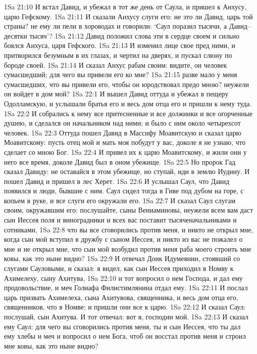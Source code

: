 1Sa 21:10  И встал Давид, и убежал в тот же день от Саула, и пришел к Анхусу, царю Гефскому.
1Sa 21:11  И сказали Анхусу слуги его: не это ли Давид, царь той страны? не ему ли пели в хороводах и говорили: `Саул поразил тысячи, а Давид--десятки тысяч'?
1Sa 21:12  Давид положил слова эти в сердце своем и сильно боялся Анхуса, царя Гефского.
1Sa 21:13  И изменил лице свое пред ними, и притворился безумным в их глазах, и чертил на дверях, и пускал слюну по бороде своей.
1Sa 21:14  И сказал Анхус рабам своим: видите, он человек сумасшедший; для чего вы привели его ко мне?
1Sa 21:15  разве мало у меня сумасшедших, что вы привели его, чтобы он юродствовал предо мною? неужели он войдет в дом мой?
1Sa 22:1  И вышел Давид оттуда и убежал в пещеру Одолламскую, и услышали братья его и весь дом отца его и пришли к нему туда.
1Sa 22:2  И собрались к нему все притесненные и все должники и все огорченные душею, и сделался он начальником над ними; и было с ним около четырехсот человек.
1Sa 22:3  Оттуда пошел Давид в Массифу Моавитскую и сказал царю Моавитскому: пусть отец мой и мать моя побудут у вас, доколе я не узнаю, что сделает со мною Бог.
1Sa 22:4  И привел их к царю Моавитскому, и жили они у него все время, доколе Давид был в оном убежище.
1Sa 22:5  Но пророк Гад сказал Давиду: не оставайся в этом убежище, но ступай, иди в землю Иудину. И пошел Давид и пришел в лес Херет.
1Sa 22:6  И услышал Саул, что Давид появился и люди, бывшие с ним. Саул сидел тогда в Гиве под дубом на горе, с копьем в руке, и все слуги его окружали его.
1Sa 22:7  И сказал Саул слугам своим, окружавшим его: послушайте, сыны Вениаминовы, неужели всем вам даст сын Иессея поля и виноградники и всех вас поставит тысяченачальниками и сотниками,
1Sa 22:8  что вы все сговорились против меня, и никто не открыл мне, когда сын мой вступил в дружбу с сыном Иессея, и никто из вас не пожалел о мне и не открыл мне, что сын мой возбудил против меня раба моего строить мне ковы, как это ныне видно?
1Sa 22:9  И отвечал Доик Идумеянин, стоявший со слугами Сауловыми, и сказал: я видел, как сын Иессея приходил в Номву к Ахимелеху, сыну Ахитува,
1Sa 22:10  и тот вопросил о нем Господа, и дал ему продовольствие, и меч Голиафа Филистимлянина отдал ему.
1Sa 22:11  И послал царь призвать Ахимелеха, сына Ахитувова, священника, и весь дом отца его, священников, что в Номве; и пришли они все к царю.
1Sa 22:12  И сказал Саул: послушай, сын Ахитува. И тот отвечал: вот я, господин мой.
1Sa 22:13  И сказал ему Саул: для чего вы сговорились против меня, ты и сын Иессея, что ты дал ему хлебы и меч и вопросил о нем Бога, чтоб он восстал против меня и строил мне ковы, как это ныне видно?
